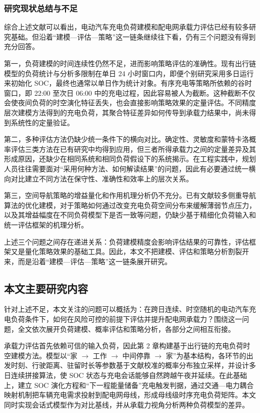 \documentclass[10pt,a4paper]{article}
\numberwithin{equation}{section}
\numberwithin{table}{section}
\numberwithin{figure}{section}
\begin{document}
    \subsubsection{研究现状总结与不足}

    综合上述文献可以看出，电动汽车充电负荷建模和配电网承载力评估已经有较多研究基础。但沿着“建模—评估—策略”这一链条继续往下看，仍有三个问题没有得到充分回答。

    第一，负荷建模的时间连续性仍然不足，进而影响策略评估的准确性。现有出行链模型的负荷统计与分析多限制在单日 24 小时窗口内，即便个别研究采用多日运行来初始化 SOC，最终也通常以单日作为统计对象。有序充电等策略所依赖的谷时窗口，即 22:00 至次日 06:00 中的充电过程，因此容易被人为截断。这种截断不仅会使夜间负荷的时空演化特征丢失，也会直接影响策略效果的定量评估。不同精度层次建模方法得到的充电负荷，其聚合特征差异如何传导到承载力结果中，尚未得到系统性的定量验证。

    第二，多种评估方法仍缺少统一条件下的横向对比。确定性、灵敏度和蒙特卡洛概率评估三类方法在已有研究中均得到应用，但三者所得承载力之间的定量差异及其形成原因，还缺少在相同系统和相同负荷假设下的系统揭示。在工程实践中，规划人员往往需要面对“采用何种方法、如何解读结果”的问题，因此有必要通过统一横向对比建立不同方法在保守性、准确性和效率上的层次关系。

    第三，空间导航策略的增益量化和作用机理分析仍不充分。已有文献较多侧重导航算法的优化建模，对于策略如何通过改变充电负荷空间分布来缓解薄弱节点压力，以及其增益幅度在不同负荷模型下是否一致等问题，仍缺少基于精细化负荷输入和统一评估框架的机理分析。

    上述三个问题之间存在递进关系：负荷建模精度会影响评估结果的可靠性，评估框架又是量化策略效果的基础工具。因此，本文不把建模、评估和策略分析割裂开来，而是沿着“建模—评估—策略”这一链条展开研究。

    \subsection{本文主要研究内容}

    针对上述不足，本文关注的问题可以概括为：在跨日连续、时空随机的电动汽车充电负荷条件下，如何在风险可控的前提下评估并提升配电网承载力？围绕这一问题，全文依次展开负荷建模、概率评估和策略分析，各部分之间相互衔接。

    承载力评估首先依赖可信的输入负荷，因此第 2 章构建基于出行链的充电负荷时空建模方法。模型以“家 $\rightarrow$ 工作 $\rightarrow$ 中间停靠 $\rightarrow$ 家”为基本结构，各环节的出发时刻、行驶距离、驻留时长等参数基于文献校准的概率分布独立采样，并设计多日连续拼接算法，使 SOC 状态与充电会话能够自然跨越午夜并延续。在此基础上，建立 SOC 演化方程和“下一程能量储备”充电触发判据，通过交通—电力耦合映射机制把车辆充电需求投射到配电网母线，形成母线级时序充电负荷矩阵。本文同时实现会话式模型作为对比基线，并从承载力视角分析两种负荷模型的差异。
\end{document}

